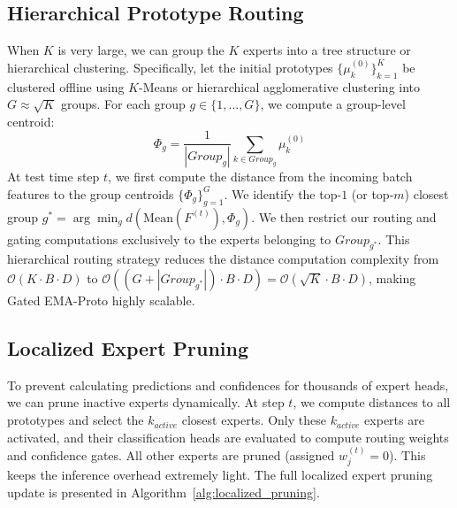 \documentclass{article}
\theoremstyle{plain}
\theoremstyle{definition}
\theoremstyle{remark}
\begin{document}
\subsection{Hierarchical Prototype Routing}
When $K$ is very large, we can group the $K$ experts into a tree structure or hierarchical clustering.
Specifically, let the initial prototypes $\{\mu_k^{(0)}\}_{k=1}^K$ be clustered offline using $K$-Means or hierarchical agglomerative clustering into $G \approx \sqrt{K}$ groups. For each group $g \in \{1, \dots, G\}$, we compute a group-level centroid:
\begin{equation}
    \Phi_g = \frac{1}{|Group_g|} \sum_{k \in Group_g} \mu_k^{(0)}
\end{equation}
At test time step $t$, we first compute the distance from the incoming batch features to the group centroids $\{\Phi_g\}_{g=1}^G$. We identify the top-$1$ (or top-$m$) closest group $g^* = \arg\min_g d(\text{Mean}(F^{(t)}), \Phi_g)$. We then restrict our routing and gating computations exclusively to the experts belonging to $Group_{g^*}$.
This hierarchical routing strategy reduces the distance computation complexity from $\mathcal{O}(K \cdot B \cdot D)$ to $\mathcal{O}((G + |Group_{g^*}|) \cdot B \cdot D) = \mathcal{O}(\sqrt{K} \cdot B \cdot D)$, making Gated EMA-Proto highly scalable.

\subsection{Localized Expert Pruning}
To prevent calculating predictions and confidences for thousands of expert heads, we can prune inactive experts dynamically. At step $t$, we compute distances to all prototypes and select the $k_{active}$ closest experts. Only these $k_{active}$ experts are activated, and their classification heads are evaluated to compute routing weights and confidence gates. All other experts are pruned (assigned $w_j^{(t)} = 0$). This keeps the inference overhead extremely light. The full localized expert pruning update is presented in Algorithm~\ref{alg:localized_pruning}.
\end{document}

